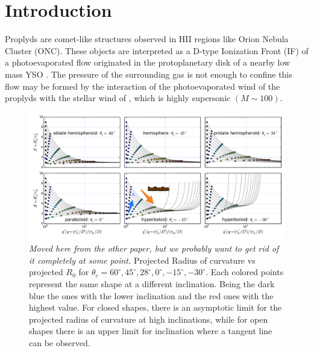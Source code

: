 \section{Introduction}
\label{sec:introduction-proplyd}

Proplyds are comet-like structures observed in HII regions like Orion Nebula Cluster (ONC). 
These objects are interpreted as a D-type Ionization Front (IF) of a photoevaporated flow 
originated in the protoplanetary disk of a nearby low mass YSO \citep{Johnstone:1998}.
The pressure of the surrounding gas is not enough to confine this flow \citep{HA:1998}
may be formed by the interaction of the photoevaporated wind of the proplyds with the stellar wind of \thC{}, which is highly supersonic $(M \sim 100)$. 

\begin{figure}
\includegraphics[width=0.9\linewidth]{annotated}
\caption{\textit{Moved here from the other paper, but we probably want
    to get rid of it completely at some point.} Projected Radius of
  curvature vs projected $R_0$ for
  $\theta_c=60^\circ,45^\circ,28^\circ, 0^\circ,-15^\circ,-30^\circ$. Each colored points represent
  the same shape at a different inclination. Being the dark blue the
  ones with the lower inclination and the red ones with the highest
  value. For closed shapes, there is an asymptotic limit for the
  projected radius of curvature at high inclinations, while for open
  shapes there is an upper limit for inclination where a tangent line
  can be observed.}
\label{fig:Apqp}
\end{figure}

